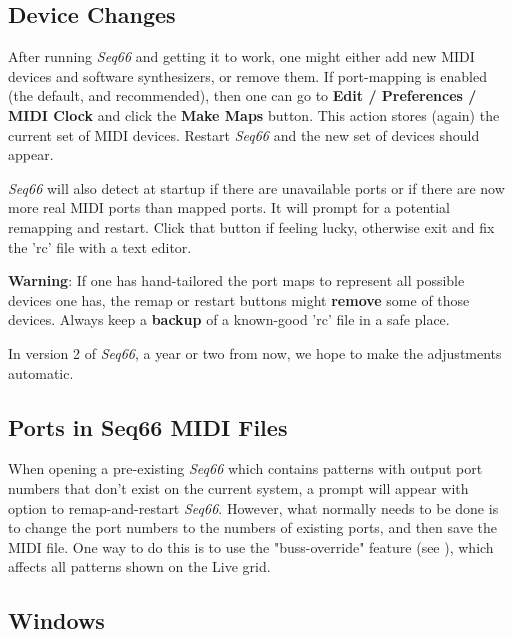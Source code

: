 \subsection{Device Changes}
\label{subsec:introduction_device_changes}

   After running \textsl{Seq66} and getting it to work, one might
   either add new MIDI devices and software synthesizers, or remove
   them.
   If port-mapping is enabled (the default, and recommended), then
   one can go to
   \textbf{Edit / Preferences / MIDI Clock} and
   click the \textbf{Make Maps} button.
   This action stores (again) the current set of MIDI devices.
   Restart \textsl{Seq66} and the new set of devices should appear.

   \textsl{Seq66} will also detect at startup if there are unavailable
   ports or if there are now more real MIDI ports than mapped ports.
   It will prompt for a potential remapping and restart.
   Click that button if feeling lucky, otherwise
   exit and fix the 'rc' file with a text editor.

   \textbf{Warning}:
   If one has hand-tailored the port maps to represent all possible devices one
   has, the remap or restart buttons might \textbf{remove}
   some of those devices.
   Always keep a \textbf{backup}
   of a known-good 'rc' file in a safe place.

   In version 2 of \textsl{Seq66}, a year or two from now, we hope to make
   the adjustments automatic.

\subsection{Ports in Seq66 MIDI Files}
\label{subsec:introduction_ports}

   When opening a pre-existing \textsl{Seq66} which contains patterns with
   output port numbers that don't exist on the current system, a prompt
   will appear with option to remap-and-restart \textsl{Seq66}.
   However, what normally needs to be done is to change the
   port numbers to the numbers of existing ports, and then save the MIDI file.
   One way to do this is to use the "buss-override" feature
   (see ),
   which affects all patterns shown on the Live grid.

\subsection{Windows}
\label{subsec:introduction_windows}

